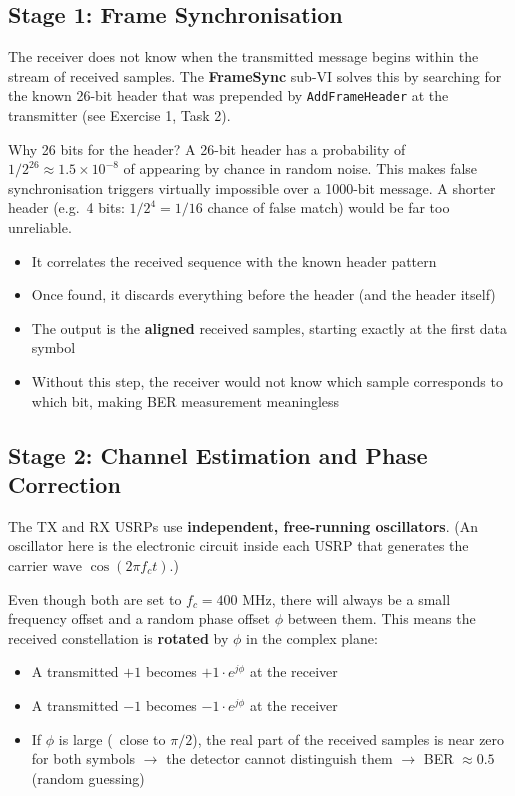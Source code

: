 \subsection{Stage 1: Frame Synchronisation}

The receiver does not know when the transmitted message begins within the stream of received samples. The \textbf{FrameSync} sub-VI solves this by searching for the known 26-bit header that was prepended by \texttt{AddFrameHeader} at the transmitter (see Exercise 1, Task 2).

\begin{IntuitionBox}{Why 26 bits for the header?}
A 26-bit header has a probability of $1/2^{26} \approx 1.5 \times 10^{-8}$ of appearing by chance in random noise. This makes false synchronisation triggers virtually impossible over a 1000-bit message. A shorter header (e.g.\ 4 bits: $1/2^4 = 1/16$ chance of false match) would be far too unreliable.
\end{IntuitionBox}

\begin{itemize}
\item It correlates the received sequence with the known header pattern
\item Once found, it discards everything before the header (and the header itself)
\item The output is the \textbf{aligned} received samples, starting exactly at the first data symbol
\item Without this step, the receiver would not know which sample corresponds to which bit, making BER measurement meaningless
\end{itemize}

\subsection{Stage 2: Channel Estimation and Phase Correction}

The TX and RX USRPs use \textbf{independent, free-running oscillators}. (An oscillator here is the electronic circuit inside each USRP that generates the carrier wave $\cos(2\pi f_c t)$.)

Even though both are set to $f_c = 400$ MHz, there will always be a small frequency offset and a random phase offset $\phi$ between them. This means the received constellation is \textbf{rotated} by $\phi$ in the complex plane:

\begin{itemize}
\item A transmitted $+1$ becomes $+1 \cdot e^{j\phi}$ at the receiver
\item A transmitted $-1$ becomes $-1 \cdot e^{j\phi}$ at the receiver
\item If $\phi$ is large (\ close to $\pi/2$), the real part of the received samples is near zero for both symbols $\rightarrow$ the detector cannot distinguish them $\rightarrow$ BER $\approx 0.5$ (random guessing)
\end{itemize}

